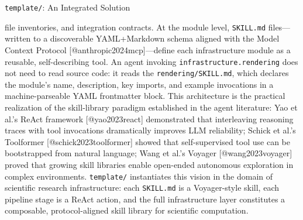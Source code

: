 \documentclass[
  ignorenonframetext,
]{beamer}
\begin{document}
\begin{frame}[fragile]{\texttt{template/}: An Integrated Solution}
\begin{enumerate}
  file inventories, and integration contracts. At the module level,
  \texttt{SKILL.md} files---written to a discoverable YAML+Markdown
  schema aligned with the Model Context Protocol
  {[}@anthropic2024mcp{]}---define each infrastructure module as a
  reusable, self-describing tool. An agent invoking
  \texttt{infrastructure.rendering} does not need to read source code:
  it reads the \texttt{rendering/SKILL.md}, which declares the module's
  name, description, key imports, and example invocations in a
  machine-parseable YAML frontmatter block. This architecture is the
  practical realization of the skill-library paradigm established in the
  agent literature: Yao et al.'s ReAct framework {[}@yao2023react{]}
  demonstrated that interleaving reasoning traces with tool invocations
  dramatically improves LLM reliability; Schick et al.'s Toolformer
  {[}@schick2023toolformer{]} showed that self-supervised tool use can
  be bootstrapped from natural language; Wang et al.'s Voyager
  {[}@wang2023voyager{]} proved that growing skill libraries enable
  open-ended autonomous exploration in complex environments.
  \texttt{template/} instantiates this vision in the domain of
  scientific research infrastructure: each \texttt{SKILL.md} is a
  Voyager-style skill, each pipeline stage is a ReAct action, and the
  full infrastructure layer constitutes a composable, protocol-aligned
  skill library for scientific computation.
\end{enumerate}
\end{frame}
\end{document}

